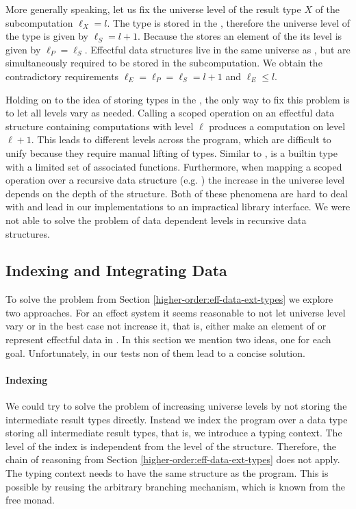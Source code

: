 More generally speaking, let us fix the universe level of the result type $X$ of
the subcomputation $\ell_X = l$.
The type is stored in the , therefore the universe level of the
 type is given by $\ell_S = l + 1$.
Because the  stores an element of the  its
level is given by $\ell_P = \ell_S$.
Effectful data structures live in the same universe as , but
are simultaneously required to be stored in the subcomputation.
We obtain the contradictory requirements $\ell_E = \ell_P = \ell_S = l + 1$ and
$\ell_E  \leqslant l$.

Holding on to the idea of storing types in the , the only way to
fix this problem is to let all levels vary as needed.
Calling a scoped operation on an effectful data structure containing
computations with level $\ell$ produces a computation on level $\ell + 1$.
This leads to different levels across the program, which are difficult to unify
because they require manual lifting of types.
Similar to ,  is a builtin type with a
limited set of associated functions.
Furthermore, when mapping a scoped operation over a recursive data structure
(e.g. ) the increase in the universe level depends on the
depth of the structure.
Both of these phenomena are hard to deal with and lead in our implementations to
an impractical library interface.
We were not able to solve the problem of data dependent levels in recursive data
structures.


\subsection{Indexing and Integrating Data}
\label{higher-order:fixes}

To solve the problem from Section \ref{higher-order:eff-data-ext-types} we
explore two approaches.
For an effect system it seems reasonable to not let universe level vary or in
the best case not increase it, that is, either make  an
element of  or represent effectful data in .
In this section we mention two ideas, one for each goal.
Unfortunately, in our tests non of them lead to a concise solution.

\paragraph{Indexing}
We could try to solve the problem of increasing universe levels by not storing
the intermediate result types directly.
Instead we index the program over a data type storing all intermediate result
types, that is, we introduce a typing context.
The level of the index is independent from the level of the structure.
Therefore, the chain of reasoning from Section
\ref{higher-order:eff-data-ext-types} does not apply.
The typing context needs to have the same structure as the program.
This is possible by reusing the arbitrary branching mechanism, which is known
from the free monad.

